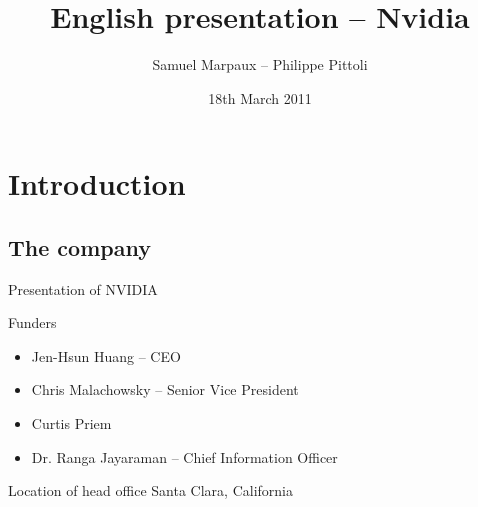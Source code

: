 \documentclass{beamer}
\date{18th March 2011}
\author{Samuel Marpaux -- Philippe Pittoli}
\title[Nvidia]{English presentation -- Nvidia}
\begin{document}

\section{Introduction}
\subsection{The company}
\begin{frame}{Presentation of NVIDIA}
	\begin{block}{Funders}
		\begin{itemize}
			\item<+->{Jen-Hsun Huang -- CEO}
			\item<+->{Chris Malachowsky -- Senior Vice President}
			\item<+->{Curtis Priem}
			\item<+->{Dr. Ranga Jayaraman -- Chief Information Officer}
		\end{itemize}
	\end{block}

	\pause

	\begin{block}{Location of head office}
		Santa Clara, California
	\end{block}
\end{frame}
\end{document}
